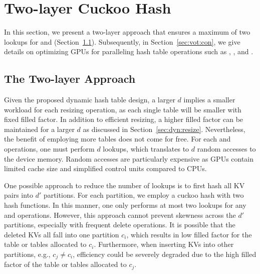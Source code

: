 


\section{Two-layer Cuckoo Hash}\label{sec:vot}
In this section, we present a two-layer approach that ensures a maximum of two lookups for  and  (Section~\ref{sec:vot:two}). 
Subsequently, in Section~\ref{sec:vot:con}, we give details on optimizing GPUs for paralleling hash table operations such as , , and .



\subsection{The Two-layer Approach}\label{sec:vot:two}
Given the proposed dynamic hash table design, a larger $d$ implies a smaller workload for each resizing operation, as each single table will be smaller with fixed filled factor. In addition to efficient resizing, a higher filled factor can be maintained for a larger $d$ as discussed in Section~\ref{sec:dyn:resize}. Nevertheless, the benefit of employing more tables does not come for free. For each  and  operations, one must perform $d$ lookups, which translates to $d$ random accesses to the device memory. 
Random accesses are particularly expensive as GPUs contain limited cache size and simplified control units compared to CPUs.

One possible approach to reduce the number of lookups is to first hash all KV pairs into $d'$ partitions. For each partition, we employ a cuckoo hash with two hash functions. In this manner, one only performs at most two lookups for any  and  operations. However, this approach cannot prevent skewness across the $d'$ partitions, especially with frequent delete operations. It is possible that the deleted KVs all fall into one partition $c_i$, which results in low filled factor for the table or tables allocated to $c_i$. Furthermore, when inserting KVs into other partitions, e.g., $c_j \neq c_i$, efficiency could be severely degraded due to the high filled factor of the table or tables allocated to $c_j$. 

